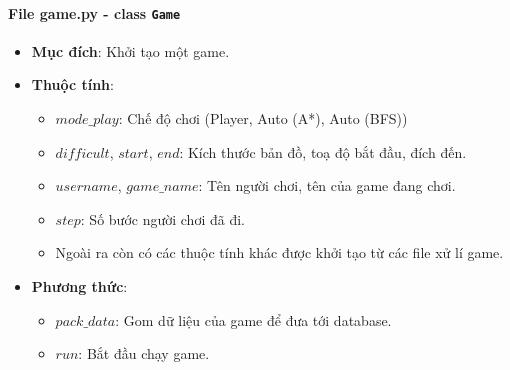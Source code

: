 \paragraph{File game.py - class \texttt{Game}}
\begin{itemize}
    \item \textbf{Mục đích}: Khởi tạo một game.
    \item \textbf{Thuộc tính}:
        \begin{itemize}
            \item $mode\_play$: Chế độ chơi (Player, Auto (A*), Auto (BFS))
            \item $difficult$, $start$, $end$: Kích thước bản đồ, toạ độ bắt đầu, đích đến. 
            \item $username$, $game\_name$: Tên người chơi, tên của game đang chơi.
            \item $step$: Số bước người chơi đã đi.
            \item Ngoài ra còn có các thuộc tính khác được khởi tạo từ các file xử lí game.
        \end{itemize}
    \item \textbf{Phương thức}:
        \begin{itemize}
            \item $pack\_data$: Gom dữ liệu của game để đưa tới database.
            \item $run$: Bắt đầu chạy game.
        \end{itemize}
\end{itemize}